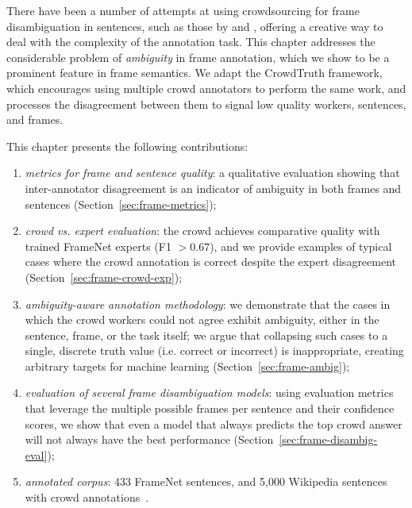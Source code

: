 There have been a number of attempts at using crowdsourcing for frame disambiguation in sentences, such as those by \citet{Hong:2011:GCR:2018966.2018970} and \citet{chang2015scaling}, offering a creative way to deal with the complexity of the annotation task. This chapter addresses the considerable problem of \emph{ambiguity}  in frame annotation, which we show to be a prominent feature in frame semantics.  We adapt the CrowdTruth framework, which encourages using multiple crowd annotators to perform the same work, and processes the disagreement between them to signal low quality workers, sentences, and frames.

This chapter presents the following contributions:

\begin{enumerate}

\item \emph{metrics for frame and sentence quality}: a qualitative evaluation showing that inter-annotator disagreement is an indicator of ambiguity in both frames and sentences {\color{blue} (Section~\ref{sec:frame-metrics})};

\item \emph{crowd vs. expert evaluation}: the crowd achieves comparative quality with trained FrameNet experts (F1 $>0.67$), and we provide examples of typical cases where the crowd annotation is correct despite the expert disagreement {\color{blue} (Section~\ref{sec:frame-crowd-exp})};

\item \emph{ambiguity-aware annotation methodology}: we demonstrate that the cases in which the crowd workers could not agree exhibit ambiguity, either in the sentence, frame, or the task itself; we argue that collapsing such cases to a single, discrete truth value (i.e. correct or incorrect) is inappropriate, creating arbitrary targets for machine learning {\color{blue} (Section~\ref{sec:frame-ambig})};

\item \emph{evaluation of several frame disambiguation models}: using evaluation metrics that leverage the multiple possible frames per sentence and their confidence scores, we show that even a model that always predicts the top crowd answer will not always have the best performance {\color{blue} (Section~\ref{sec:frame-disambig-eval})};

\item \emph{annotated corpus}: 433 FrameNet sentences, and 5,000 Wikipedia sentences with crowd annotations~\cite{anca_dumitrache_2018_1472345}.

\end{enumerate}


